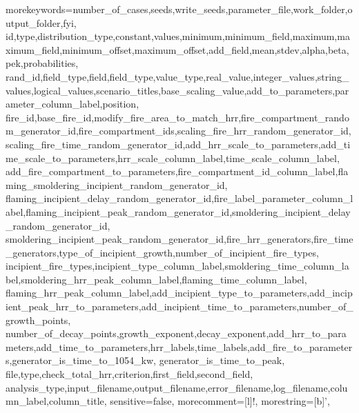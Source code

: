 \usepackage{listings}
\usepackage{textcomp}
\usepackage{footmisc}
 {morekeywords={number_of_cases,seeds,write_seeds,parameter_file,work_folder,output_folder,fyi,
    id,type,distribution_type,constant,values,minimum,minimum_field,maximum,maximum_field,minimum_offset,maximum_offset,add_field,mean,stdev,alpha,beta,pek,probabilities,
    rand_id,field_type,field,field_type,value_type,real_value,integer_values,string_values,logical_values,scenario_titles,base_scaling_value,add_to_parameters,parameter_column_label,position,
    fire_id,base_fire_id,modify_fire_area_to_match_hrr,fire_compartment_random_generator_id,fire_compartment_ids,scaling_fire_hrr_random_generator_id,
        scaling_fire_time_random_generator_id,add_hrr_scale_to_parameters,add_time_scale_to_parameters,hrr_scale_column_label,time_scale_column_label,
        add_fire_compartment_to_parameters,fire_compartment_id_column_label,flaming_smoldering_incipient_random_generator_id,
        flaming_incipient_delay_random_generator_id,fire_label_parameter_column_label,flaming_incipient_peak_random_generator_id,smoldering_incipient_delay_random_generator_id,
        smoldering_incipient_peak_random_generator_id,fire_hrr_generators,fire_time_generators,type_of_incipient_growth,number_of_incipient_fire_types,
        incipient_fire_types,incipient_type_column_label,smoldering_time_column_label,smoldering_hrr_peak_column_label,flaming_time_column_label,
        flaming_hrr_peak_column_label,add_incipient_type_to_parameters,add_incipient_peak_hrr_to_parameters,add_incipient_time_to_parameters,number_of_growth_points,
        number_of_decay_points,growth_exponent,decay_exponent,add_hrr_to_parameters,add_time_to_parameters,hrr_labels,time_labels,add_fire_to_parameters,generator_is_time_to_1054_kw,
        generator_is_time_to_peak,
    file,type,check_total_hrr,criterion,first_field,second_field,
    analysis_type,input_filename,output_filename,error_filename,log_filename,column_label,column_title},
sensitive=false,
morecomment=[l]{!},
morestring=[b]', }
\usepackage{wrapfig}
\usepackage{morefloats}
\usepackage{siunitx}


